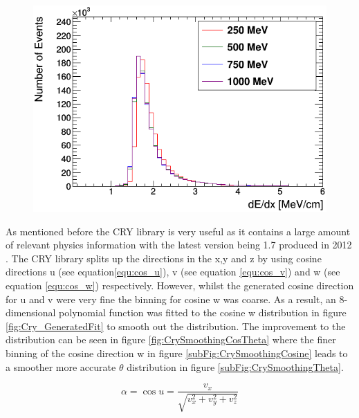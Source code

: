 \begin{figure}[!h]
 \centering
 \includegraphics[width=0.7\linewidth]{Chapter4/Figs/Raster/year1Plots/muons_per_mev_cm.png}
 \label{fig:mev_per_cm_muons}
\end{figure}

As mentioned before the CRY library is very useful as it contains a large amount of relevant physics information with the latest version being 1.7 produced in 2012 \cite{hagmann2012cosmicCry}. The CRY library splits up the directions in the x,y and z by using cosine directions u (see equation\ref{equ:cos_u}), v (see equation \ref{equ:cos_v}) and w (see equation \ref{equ:cos_w}) respectively. However, whilst the generated cosine direction for u and v were very fine the binning for cosine w was coarse. As a result, an 8-dimensional polynomial function was fitted to the cosine w distribution in figure \ref{fig:Cry_GeneratedFit} to smooth out the distribution. The improvement to the distribution can be seen in figure \ref{fig:CrySmoothingCosTheta} where the finer binning of the cosine direction w in figure \ref{subFig:CrySmoothingCosine} leads to a smoother more accurate $\theta$ distribution in figure \ref{subFig:CrySmoothingTheta}. 

\begin{equation}
\alpha = \cos{u} = \frac{v_x}{\sqrt{v_x^2+v_y^2+v_z^2}}
\label{equ:cos_u}
\end{equation}

